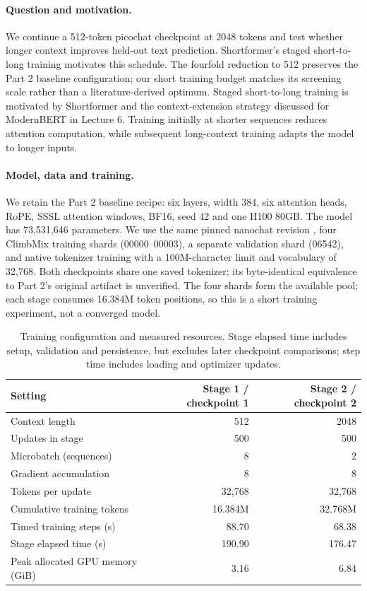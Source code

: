\documentclass[11pt]{article}
\begin{document}
\paragraph{Question and motivation.}
We continue a 512-token picochat checkpoint at 2048 tokens and test whether
longer context improves held-out text prediction. Shortformer's staged
short-to-long training motivates this schedule\cite{p4-shortformer}.
The fourfold reduction to 512 preserves the Part 2 baseline configuration;
our short training budget matches its screening scale rather than a
literature-derived optimum.
Staged short-to-long training is motivated by Shortformer
and the context-extension strategy discussed for
ModernBERT in Lecture 6. Training initially at shorter
sequences reduces attention computation, while subsequent
long-context training adapts the model to longer inputs.
\paragraph{Model, data and training.}
We retain the Part 2 baseline recipe: six layers, width 384, six attention
heads, RoPE, SSSL attention windows, BF16, seed 42 and one H100 80GB.
The model has 73,531,646 parameters. We use the same pinned nanochat revision
\cite{p4-nanochat}, four ClimbMix training shards (00000--00003), a separate
validation shard (06542), and native tokenizer training with a 100M-character
limit and vocabulary of 32,768. Both checkpoints share one saved tokenizer;
its byte-identical equivalence to Part 2's original artifact is unverified.
The four shards form the available pool; each stage consumes 16.384M token
positions, so this is a short training experiment, not a converged model.

\begin{table}[htbp]
\centering
\small
\begin{tabular}{lrr}
\hline
Setting & Stage 1 / checkpoint 1 & Stage 2 / checkpoint 2 \\
\hline
Context length & 512 & 2048 \\
Updates in stage & 500 & 500 \\
Microbatch (sequences) & 8 & 2 \\
Gradient accumulation & 8 & 8 \\
Tokens per update & 32,768 & 32,768 \\
Cumulative training tokens & 16.384M & 32.768M \\
Timed training steps (s) & 88.70 & 68.38 \\
Stage elapsed time (s) & 190.90 & 176.47 \\
Peak allocated GPU memory (GiB) & 3.16 & 6.84 \\
\hline
\end{tabular}
\caption{Training configuration and measured resources. Stage elapsed time includes
setup, validation and persistence, but excludes later checkpoint comparisons;
step time includes loading and optimizer updates.}
\label{tab:p4-training}
\end{table}
\end{document}
